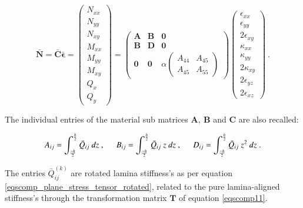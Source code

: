 \begin{equation} 
\bar{\mathbf{N}} = \bar{\mathbf{C}} \bar{\boldsymbol{\epsilon}} =
\begin{pmatrix}
N_{xx} \\
N_{yy} \\
N_{xy} \\
M_{xx} \\
M_{yy} \\
M_{xy} \\
Q_{x} \\
Q_{y} 
\end{pmatrix} 
=
\begin{pmatrix}
\mathbf{A} & \mathbf{B} & \mathbf{0} \\
\mathbf{B} & \mathbf{D} & \mathbf{0} \\
\mathbf{0}& \mathbf{0} & \alpha		\begin{pmatrix}
{A}_{44} & {A}_{45} \\
{A}_{45} & {A}_{55} 
\end{pmatrix} 
\end{pmatrix} 
\begin{pmatrix}
\epsilon_{xx} \\
\epsilon_{yy} \\
2\epsilon_{xy}\\
\kappa_{xx}\\
\kappa_{yy}\\
2\kappa_{xy} \\
2\epsilon_{yz} \\
2\epsilon_{xz}
\end{pmatrix}
\label{eqscomp_laminate_form1}\ .
\end{equation}

The individual entries of the material sub matrices $\mathbf{A},\ \mathbf{B}$ and $\mathbf{C}$ are also recalled:

\begin{equation} 
A_{ij} = 
\int_{\frac{-h}{2}}^{\frac{h}{2}}
\bar{Q}_{ij}
\ dz\ ,
\hspace{5mm}
B_{ij} = 
\int_{\frac{-h}{2}}^{\frac{h}{2}}
\bar{Q}_{ij}\ z
\ dz\ ,
\hspace{5mm}
D_{ij} = 
\int_{\frac{-h}{2}}^{\frac{h}{2}}
\bar{Q}_{ij}\ z^2
\ dz
\label{eqscomp_laminate_form2}\ .
\end{equation}

The entries $\bar{Q}_{ij}^{(k)}$ are rotated lamina stiffness's as per equation \ref{eqscomp_plane_stress_tensor_rotated}, related to the pure lamina-aligned stiffness's through the transformation matrix $\mathbf{T}$ of equation \ref{eqscomp11}.

